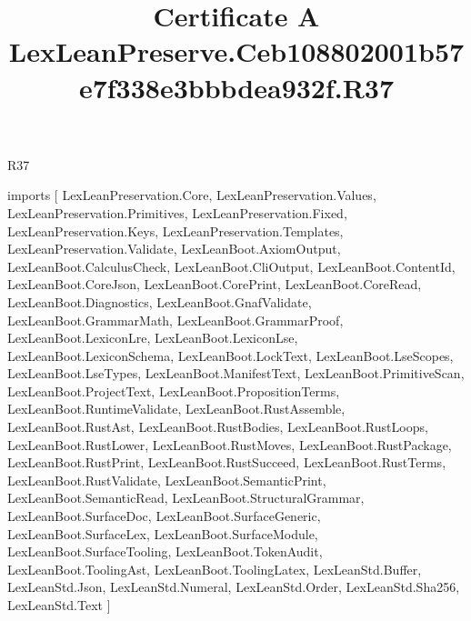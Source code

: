 \begin{lexlean}{R37}
\title{Certificate A LexLeanPreserve.Ceb108802001b57e7f338e3bbbdea932f.R37}
\begin{coremodule}
imports [
  LexLeanPreservation.Core,
  LexLeanPreservation.Values,
  LexLeanPreservation.Primitives,
  LexLeanPreservation.Fixed,
  LexLeanPreservation.Keys,
  LexLeanPreservation.Templates,
  LexLeanPreservation.Validate,
  LexLeanBoot.AxiomOutput,
  LexLeanBoot.CalculusCheck,
  LexLeanBoot.CliOutput,
  LexLeanBoot.ContentId,
  LexLeanBoot.CoreJson,
  LexLeanBoot.CorePrint,
  LexLeanBoot.CoreRead,
  LexLeanBoot.Diagnostics,
  LexLeanBoot.GnafValidate,
  LexLeanBoot.GrammarMath,
  LexLeanBoot.GrammarProof,
  LexLeanBoot.LexiconLre,
  LexLeanBoot.LexiconLse,
  LexLeanBoot.LexiconSchema,
  LexLeanBoot.LockText,
  LexLeanBoot.LseScopes,
  LexLeanBoot.LseTypes,
  LexLeanBoot.ManifestText,
  LexLeanBoot.PrimitiveScan,
  LexLeanBoot.ProjectText,
  LexLeanBoot.PropositionTerms,
  LexLeanBoot.RuntimeValidate,
  LexLeanBoot.RustAssemble,
  LexLeanBoot.RustAst,
  LexLeanBoot.RustBodies,
  LexLeanBoot.RustLoops,
  LexLeanBoot.RustLower,
  LexLeanBoot.RustMoves,
  LexLeanBoot.RustPackage,
  LexLeanBoot.RustPrint,
  LexLeanBoot.RustSucceed,
  LexLeanBoot.RustTerms,
  LexLeanBoot.RustValidate,
  LexLeanBoot.SemanticPrint,
  LexLeanBoot.SemanticRead,
  LexLeanBoot.StructuralGrammar,
  LexLeanBoot.SurfaceDoc,
  LexLeanBoot.SurfaceGeneric,
  LexLeanBoot.SurfaceLex,
  LexLeanBoot.SurfaceModule,
  LexLeanBoot.SurfaceTooling,
  LexLeanBoot.TokenAudit,
  LexLeanBoot.ToolingAst,
  LexLeanBoot.ToolingLatex,
  LexLeanStd.Buffer,
  LexLeanStd.Json,
  LexLeanStd.Numeral,
  LexLeanStd.Order,
  LexLeanStd.Sha256,
  LexLeanStd.Text
]


\end{coremodule}
\end{lexlean}
